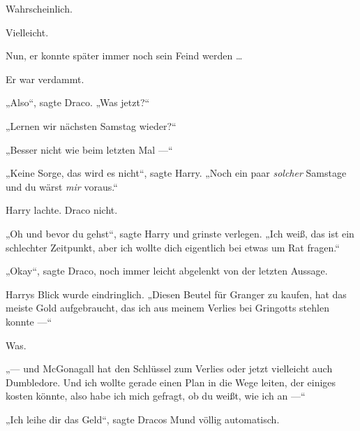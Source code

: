 Wahrscheinlich.

Vielleicht.

Nun, er konnte später immer noch sein Feind werden …

Er war verdammt.

„Also“, sagte Draco.
„Was jetzt?“

„Lernen wir nächsten Samstag wieder?“

„Besser nicht wie beim letzten Mal —“

„Keine Sorge, das wird es nicht“, sagte Harry.
„Noch ein paar \emph{solcher} Samstage und du wärst \emph{mir} voraus.“

Harry lachte. Draco nicht.

„Oh und bevor du gehst“, sagte Harry und grinste verlegen.
„Ich weiß, das ist ein schlechter Zeitpunkt, aber ich wollte dich eigentlich bei etwas um Rat fragen.“

„Okay“, sagte Draco, noch immer leicht abgelenkt von der letzten Aussage.

Harrys Blick wurde eindringlich.
„Diesen Beutel für Granger zu kaufen, hat das meiste Gold aufgebraucht, das ich aus meinem Verlies bei Gringotts stehlen konnte —“

Was.

„— und McGonagall hat den Schlüssel zum Verlies oder jetzt vielleicht auch Dumbledore. Und ich wollte gerade einen Plan in die Wege leiten, der einiges kosten könnte, also habe ich mich gefragt, ob du weißt, wie ich an —“

„Ich leihe dir das Geld“, sagte Dracos Mund völlig automatisch.

